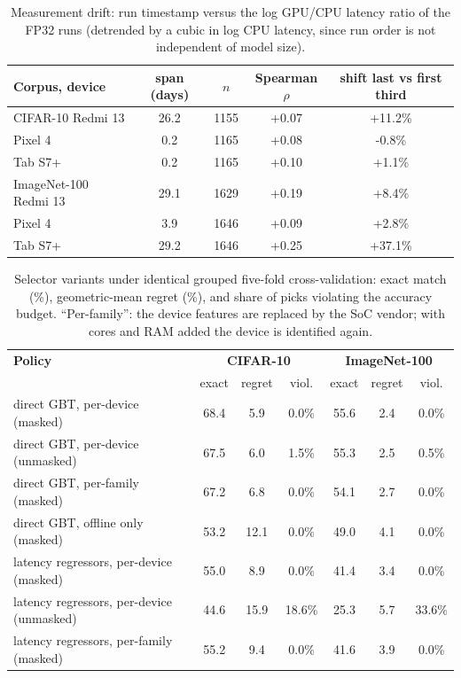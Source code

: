 \begin{table}[!t]
\centering
\caption{Measurement drift: run timestamp versus the log GPU/CPU latency ratio of the FP32 runs (detrended by a cubic in log CPU latency, since run order is not independent of model size).}
\label{tab:drift}
\footnotesize
\setlength{\tabcolsep}{3pt}
\begin{tabular}{@{}lcccc@{}}
\toprule
\textbf{Corpus, device} & span (days) & $n$ & Spearman $\rho$ & shift last vs first third \\
\midrule
CIFAR-10 Redmi 13 & 26.2 & 1155 & +0.07 & +11.2\% \\
 Pixel 4 & 0.2 & 1165 & +0.08 & -0.8\% \\
 Tab S7+ & 0.2 & 1165 & +0.10 & +1.1\% \\
\midrule
ImageNet-100 Redmi 13 & 29.1 & 1629 & +0.19 & +8.4\% \\
 Pixel 4 & 3.9 & 1646 & +0.09 & +2.8\% \\
 Tab S7+ & 29.2 & 1646 & +0.25 & +37.1\% \\
\bottomrule
\end{tabular}
\end{table}

\begin{table}[!t]
\centering
\caption{Selector variants under identical grouped five-fold cross-validation: exact match (\%), geometric-mean regret (\%), and share of picks violating the accuracy budget. ``Per-family'': the device features are replaced by the SoC vendor; with cores and RAM added the device is identified again.}
\label{tab:selvar}
\footnotesize
\setlength{\tabcolsep}{3pt}
\begin{tabular}{@{}lcccccc@{}}
\toprule
\textbf{Policy} & \multicolumn{3}{c}{\textbf{CIFAR-10}} & \multicolumn{3}{c}{\textbf{ImageNet-100}} \\
 & exact & regret & viol. & exact & regret & viol. \\
\midrule
direct GBT, per-device (masked) & 68.4 & 5.9 & 0.0\% & 55.6 & 2.4 & 0.0\% \\
direct GBT, per-device (unmasked) & 67.5 & 6.0 & 1.5\% & 55.3 & 2.5 & 0.5\% \\
direct GBT, per-family (masked) & 67.2 & 6.8 & 0.0\% & 54.1 & 2.7 & 0.0\% \\
direct GBT, offline only (masked) & 53.2 & 12.1 & 0.0\% & 49.0 & 4.1 & 0.0\% \\
latency regressors, per-device (masked) & 55.0 & 8.9 & 0.0\% & 41.4 & 3.4 & 0.0\% \\
latency regressors, per-device (unmasked) & 44.6 & 15.9 & 18.6\% & 25.3 & 5.7 & 33.6\% \\
latency regressors, per-family (masked) & 55.2 & 9.4 & 0.0\% & 41.6 & 3.9 & 0.0\% \\
\bottomrule
\end{tabular}
\end{table}

